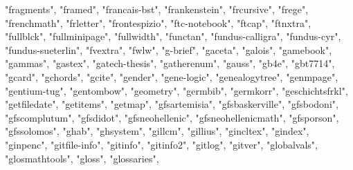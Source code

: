 \documentclass[
]{article}
\newenvironment{Shaded}{\begin{snugshade}}{\end{snugshade}}
\newcommand{\NormalTok}[1]{#1}
\newcommand{\StringTok}[1]{\textcolor[rgb]{0.31,0.60,0.02}{#1}}
\begin{document}
\begin{Shaded}
\begin{Highlighting}[]
\StringTok{"fragments"}\NormalTok{, }\StringTok{"framed"}\NormalTok{, }\StringTok{"francais{-}bst"}\NormalTok{, }\StringTok{"frankenstein"}\NormalTok{, }\StringTok{"frcursive"}\NormalTok{, }
\StringTok{"frege"}\NormalTok{, }\StringTok{"frenchmath"}\NormalTok{, }\StringTok{"frletter"}\NormalTok{, }\StringTok{"frontespizio"}\NormalTok{, }\StringTok{"ftc{-}notebook"}\NormalTok{, }
\StringTok{"ftcap"}\NormalTok{, }\StringTok{"ftnxtra"}\NormalTok{, }\StringTok{"fullblck"}\NormalTok{, }\StringTok{"fullminipage"}\NormalTok{, }\StringTok{"fullwidth"}\NormalTok{, }
\StringTok{"functan"}\NormalTok{, }\StringTok{"fundus{-}calligra"}\NormalTok{, }\StringTok{"fundus{-}cyr"}\NormalTok{, }\StringTok{"fundus{-}sueterlin"}\NormalTok{, }
\StringTok{"fvextra"}\NormalTok{, }\StringTok{"fwlw"}\NormalTok{, }\StringTok{"g{-}brief"}\NormalTok{, }\StringTok{"gaceta"}\NormalTok{, }\StringTok{"galois"}\NormalTok{, }\StringTok{"gamebook"}\NormalTok{, }
\StringTok{"gammas"}\NormalTok{, }\StringTok{"gastex"}\NormalTok{, }\StringTok{"gatech{-}thesis"}\NormalTok{, }\StringTok{"gatherenum"}\NormalTok{, }\StringTok{"gauss"}\NormalTok{, }\StringTok{"gb4e"}\NormalTok{, }
\StringTok{"gbt7714"}\NormalTok{, }\StringTok{"gcard"}\NormalTok{, }\StringTok{"gchords"}\NormalTok{, }\StringTok{"gcite"}\NormalTok{, }\StringTok{"gender"}\NormalTok{, }\StringTok{"gene{-}logic"}\NormalTok{, }
\StringTok{"genealogytree"}\NormalTok{, }\StringTok{"genmpage"}\NormalTok{, }\StringTok{"gentium{-}tug"}\NormalTok{, }\StringTok{"gentombow"}\NormalTok{, }\StringTok{"geometry"}\NormalTok{, }
\StringTok{"germbib"}\NormalTok{, }\StringTok{"germkorr"}\NormalTok{, }\StringTok{"geschichtsfrkl"}\NormalTok{, }\StringTok{"getfiledate"}\NormalTok{, }\StringTok{"getitems"}\NormalTok{, }
\StringTok{"getmap"}\NormalTok{, }\StringTok{"gfsartemisia"}\NormalTok{, }\StringTok{"gfsbaskerville"}\NormalTok{, }\StringTok{"gfsbodoni"}\NormalTok{, }\StringTok{"gfscomplutum"}\NormalTok{, }
\StringTok{"gfsdidot"}\NormalTok{, }\StringTok{"gfsneohellenic"}\NormalTok{, }\StringTok{"gfsneohellenicmath"}\NormalTok{, }\StringTok{"gfsporson"}\NormalTok{, }
\StringTok{"gfssolomos"}\NormalTok{, }\StringTok{"ghab"}\NormalTok{, }\StringTok{"ghsystem"}\NormalTok{, }\StringTok{"gillcm"}\NormalTok{, }\StringTok{"gillius"}\NormalTok{, }\StringTok{"gincltex"}\NormalTok{, }
\StringTok{"gindex"}\NormalTok{, }\StringTok{"ginpenc"}\NormalTok{, }\StringTok{"gitfile{-}info"}\NormalTok{, }\StringTok{"gitinfo"}\NormalTok{, }\StringTok{"gitinfo2"}\NormalTok{, }\StringTok{"gitlog"}\NormalTok{, }
\StringTok{"gitver"}\NormalTok{, }\StringTok{"globalvals"}\NormalTok{, }\StringTok{"glosmathtools"}\NormalTok{, }\StringTok{"gloss"}\NormalTok{, }\StringTok{"glossaries"}\NormalTok{, }

\end{Highlighting}
\end{Shaded}
\end{document}
